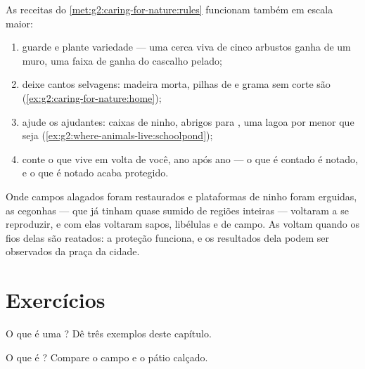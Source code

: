 \begin{method}\label{met:g5:biodiversity:help}
As receitas do \cref{met:g2:caring-for-nature:rules} funcionam também
em escala maior:
\begin{enumerate}
  \item guarde e plante variedade --- uma cerca viva de cinco
        arbustos ganha de um muro, uma faixa de  ganha do
        cascalho pelado;
  \item deixe cantos selvagens: madeira morta, pilhas de  e
        grama sem corte são 
        (\cref{ex:g2:caring-for-nature:home});
  \item ajude os ajudantes: caixas de ninho, abrigos para ,
        uma lagoa por menor que seja
        (\cref{ex:g2:where-animals-live:schoolpond});
  \item conte o que vive em volta de você, ano após ano --- o que é
        contado é notado, e o que é notado acaba protegido.
\end{enumerate}
\end{method}

\begin{example}\label{ex:g5:biodiversity:storks}
Onde campos alagados foram restaurados e plataformas de ninho foram
erguidas, as cegonhas --- que já tinham quase sumido de regiões
inteiras --- voltaram a se reproduzir, e com elas voltaram sapos,
libélulas e  de campo. As  voltam quando os fios delas
são reatados: a proteção funciona, e os resultados dela podem ser
observados da praça da cidade.
\end{example}

\section{Exercícios}

\begin{exercise}[$\star$]\label{exo:g5:biodiversity:1}
O que é uma ? Dê três exemplos deste capítulo.
\end{exercise}

\begin{exercise}[$\star$]\label{exo:g5:biodiversity:2}
O que é ? Compare o campo e o pátio calçado.
\end{exercise}

